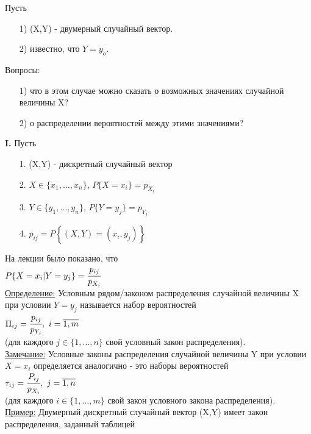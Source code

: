 

Пусть
\begin{enumerate}
	\item[1)] (X,Y) - двумерный случайный вектор.
	\item[2)] известно, что $Y = y_o$.
\end{enumerate}
Вопросы:\\
\begin{enumerate}
	\item[1)] что в этом случае можно сказать о возможных значениях случайной величины X?
	\item[2)] о распределении вероятностей между этими значениями?
\end{enumerate}


\textbf{I.} Пусть 
\begin{enumerate}
	\item[1.] (X,Y) - дискретный случайный вектор
	\item[2.] $X \in \{x_1, \ldots, x_n\}$, $P\{X = x_i\} = p_{X_i}$
	\item[3.] $Y \in \{y_1, \ldots, y_n\}$, $P\{Y = y_j\} = p_{Y_j}$
	\item[4.] $p_{ij} = P\left\{(X,Y) = (x_i, y_j)\right\}$
\end{enumerate}
На лекции было показано, что\\
$P\{X = x_i|Y = y_j\} = \cfrac{p_{ij}}{p_{X_i}}$\\


\underline{Определение:} Условным рядом/законом распределения случайной величины X при условии $Y = y_j$ называется набор вероятностей\\
$\Pi_{ij} = \cfrac{p_{ij}}{p_{Y_j}}, \ i = \overline{1,m}$\\
(для каждого $j \in \{1, \ldots, n\}$ свой условный закон распределения).\\


\underline{Замечание:} Условные законы распределения случайной величины Y при условии $X = x_i$ определяется аналогично - это наборы вероятностей\\
$\tau_{ij} = \cfrac{P_{ij}}{p_{X_i}}, \ j = \overline{1,n}$\\
(для каждого $i \in \{1, \ldots, m\}$ свой закон условного закона распределения).\\


\underline{Пример:} Двумерный дискретный случайный вектор (X,Y) имеет закон распределения, заданный таблицей\\

